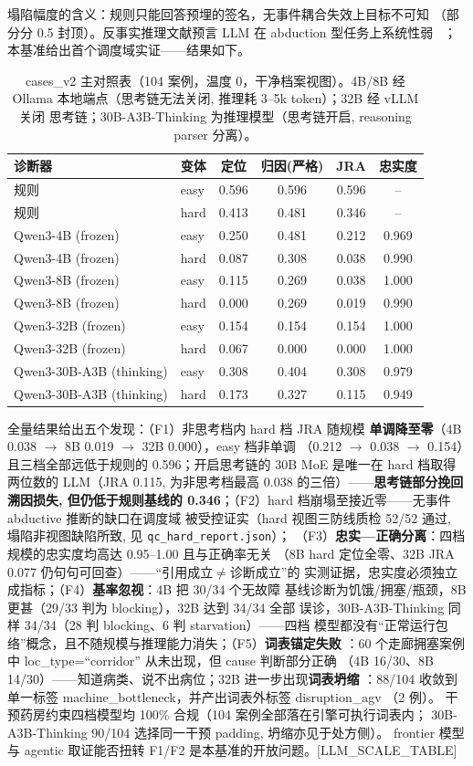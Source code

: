 \documentclass[UTF8,12pt,a4paper]{ctexart}
\begin{document}
塌陷幅度的含义：规则只能回答预埋的签名，无事件耦合失效上目标不可知
（部分分 0.5 封顶）。反事实推理文献预言 LLM 在 abduction 型任务上系统性弱
~\cite{counterbench2025,execcf2025}；本基准给出首个调度域实证——结果如下。

\begin{table}[h]\centering\small
\begin{tabular}{llcccc}
\toprule
诊断器 & 变体 & 定位 & 归因(严格) & JRA & 忠实度\\
\midrule
规则 & easy & 0.596 & 0.596 & 0.596 & --\\
规则 & hard & 0.413 & 0.481 & 0.346 & --\\
\midrule
Qwen3-4B (frozen) & easy & 0.250 & 0.481 & 0.212 & 0.969\\
Qwen3-4B (frozen) & hard & 0.087 & 0.308 & 0.038 & 0.990\\
Qwen3-8B (frozen) & easy & 0.115 & 0.269 & 0.038 & 1.000\\
Qwen3-8B (frozen) & hard & 0.000 & 0.269 & 0.019 & 0.990\\
Qwen3-32B (frozen) & easy & 0.154 & 0.154 & 0.154 & 1.000\\
Qwen3-32B (frozen) & hard & 0.067 & 0.000 & 0.000 & 1.000\\
Qwen3-30B-A3B (thinking) & easy & 0.308 & 0.404 & 0.308 & 0.979\\
Qwen3-30B-A3B (thinking) & hard & 0.173 & 0.327 & 0.115 & 0.949\\
\bottomrule
\end{tabular}
\caption{cases\_v2 主对照表（104 案例，温度 0，干净档案视图）。4B/8B 经
Ollama 本地端点（思考链无法关闭, 推理耗 3--5k token）；32B 经 vLLM 关闭
思考链；30B-A3B-Thinking 为推理模型（思考链开启, reasoning parser 分离）。
}\label{tab:main}
\end{table}

全量结果给出五个发现：（F1）非思考档内 hard 档 JRA 随规模
\textbf{单调降至零}（4B 0.038 $\to$ 8B 0.019 $\to$ 32B 0.000），easy 档非单调
（0.212 $\to$ 0.038 $\to$ 0.154）且三档全部远低于规则的 0.596；开启思考链的
30B MoE 是唯一在 hard 档取得两位数的 LLM（JRA 0.115, 为非思考档最高 0.038
的三倍）——\textbf{思考链部分挽回溯因损失, 但仍低于规则基线的 0.346}；（F2）hard 档崩塌至接近零——无事件 abductive 推断的缺口在调度域
被受控证实（hard 视图三防线质检 52/52 通过, 塌陷非视图缺陷所致, 见
\texttt{qc\_hard\_report.json}）；
（F3）\textbf{忠实—正确分离}：四档规模的忠实度均高达 0.95--1.00 且与正确率无关
（8B hard 定位全零、32B JRA 0.077 仍句句可回查）——``引用成立$\neq$诊断成立''的
实测证据，忠实度必须独立成指标；（F4）\textbf{基率忽视}：4B 把 30/34 个无故障
基线诊断为饥饿/拥塞/瓶颈，8B 更甚（29/33 判为 blocking），32B 达到 34/34 全部
误诊，30B-A3B-Thinking 同样 34/34（28 判 blocking、6 判 starvation）——四档
模型都没有``正常运行包络''概念，且不随规模与推理能力消失；（F5）\textbf{词表锚定失败}
：60 个走廊拥塞案例中 loc\_type=``corridor'' 从未出现，但 cause 判断部分正确
（4B 16/30、8B 14/30）——知道病类、说不出病位；32B 进一步出现\textbf{词表坍缩}
：88/104 收敛到单一标签 machine\_bottleneck，并产出词表外标签 disruption\_agv
（2 例）。
干预药房约束四档模型均 100\% 合规（104 案例全部落在引擎可执行词表内；
30B-A3B-Thinking 90/104 选择同一干预 padding, 坍缩亦见于处方侧）。
frontier 模型与 agentic 取证能否扭转 F1/F2 是本基准的开放问题。[LLM\_SCALE\_TABLE]
\end{document}
